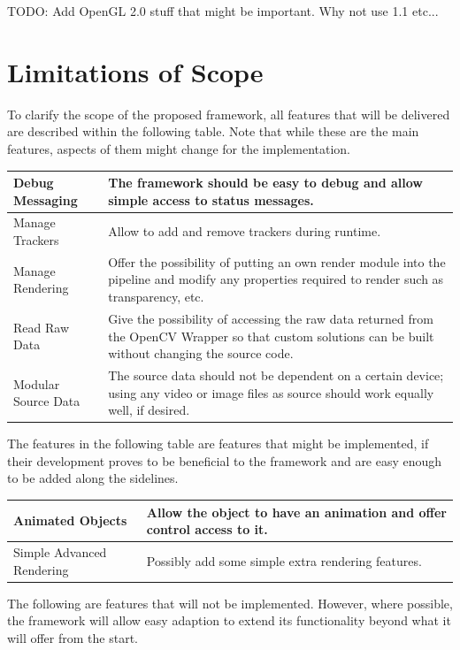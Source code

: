 TODO: Add OpenGL 2.0 stuff that might be important. Why not use 1.1 etc...

\section{Limitations of Scope}

To clarify the scope of the proposed framework, all features that will be delivered are described within the following table.
Note that while these are the main features, aspects of them might change for the implementation.

\begin{tabulary}{\textwidth}{L || L}
Debug Messaging & The framework should be easy to debug and allow simple access to status messages.\\
\hline
Manage Trackers & Allow to add and remove trackers during runtime.\\
\hline
Manage Rendering & Offer the possibility of putting an own render module into the pipeline and modify any properties required to render such as transparency, etc.\\
\hline
Read Raw Data & Give the possibility of accessing the raw data returned from the OpenCV Wrapper so that custom solutions can be built without changing the source code.\\
\hline
Modular Source Data & The source data should not be dependent on a certain device; using any video or image files as source should work equally well, if desired.
\end{tabulary}

The features in the following table are features that might be implemented, if their development proves to be beneficial to the framework and are easy enough to be added along the sidelines.

\begin{tabulary}{\textwidth}{L || L}
Animated Objects & Allow the object to have an animation and offer control access to it.\\
\hline
Simple Advanced Rendering & Possibly add some simple extra rendering features.\\
\end{tabulary}

The following are features that will not be implemented.
However, where possible, the framework will allow easy adaption to extend its functionality beyond what it will offer from the start.

